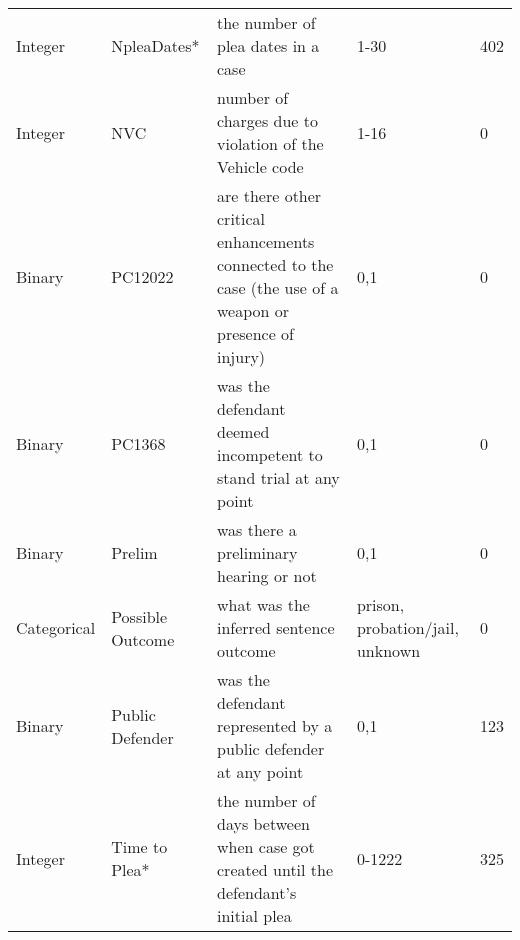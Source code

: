 \begin{table*}
\begin{tabular}{llp{8cm}p{5cm}l}
Integer     & NpleaDates*          & the number of plea dates in a case                                                                      & 1-30                                                                                                                              & 402            \\
Integer     & NVC                  & number of charges due to violation of the Vehicle code                                                  & 1-16                                                                                                                              & 0              \\
Binary      & PC12022              & are there other critical enhancements connected to the case (the use of a weapon or presence of injury) & 0,1                                                                                                                               & 0              \\
Binary      & PC1368               & was the defendant deemed incompetent to stand trial at any point                                        & 0,1                                                                                                                               & 0              \\
Binary      & Prelim               & was there a preliminary hearing or not                                                                  & 0,1                                                                                                                               & 0              \\
Categorical & Possible Outcome     & what was the inferred sentence outcome                                                                  & prison, probation/jail, unknown                                                                                                   & 0              \\
Binary      & Public Defender      & was the defendant represented by a public defender at any point                                         & 0,1                                                                                                                               & 123            \\
Integer     & Time to Plea*        & the number of days between when case got created until the defendant's initial plea                     & 0-1222                                                                                                                            & 325            \\

\end{tabular}
\end{table*}
